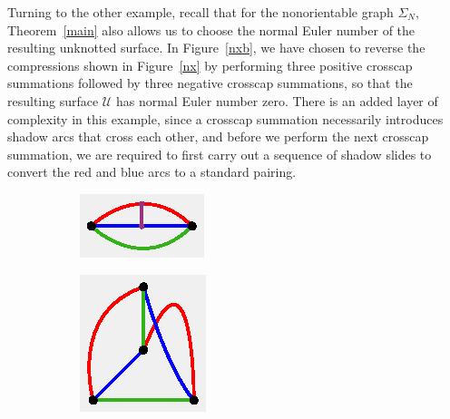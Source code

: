 \documentclass[11pt, oneside]{amsart}
\theoremstyle{theorem}
\theoremstyle{definition}
\theoremstyle{theorem}
\begin{document}
Turning to the other example, recall that for the nonorientable graph $\Sigma_N$, Theorem~\ref{main} also allows us to choose the normal Euler number of the resulting unknotted surface.  In Figure~\ref{nxb}, we have chosen to reverse the compressions shown in Figure~\ref{nx} by performing three positive crosscap summations followed by three negative crosscap summations, so that the resulting surface $\mathcal{U}$ has normal Euler number zero.  There is an added layer of complexity in this example, since a crosscap summation necessarily introduces shadow arcs that cross each other, and before we perform the next crosscap summation, we are required to first carry out a sequence of shadow slides to convert the red and blue arcs to a standard pairing.

\begin{figure}[h!]
\begin{subfigure}{.24\textwidth}
  \centering
  \includegraphics[width=.9\linewidth]{nonbt1.eps}
  \label{nxb1}
\end{subfigure}%
\begin{subfigure}{.24\textwidth}
  \centering
  \includegraphics[width=.9\linewidth]{nonbt2.eps}

\end{subfigure}
\end{figure}
\end{document}
